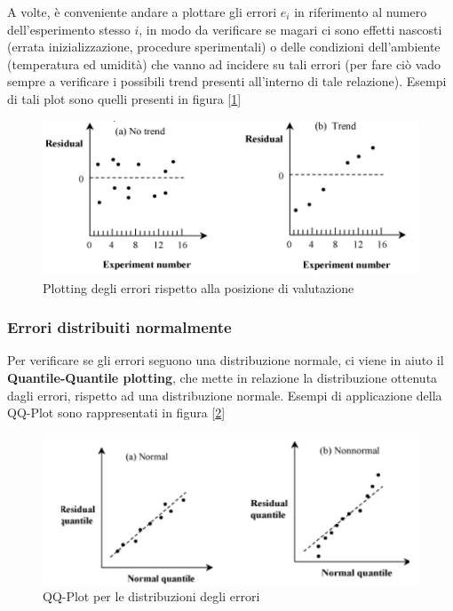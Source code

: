 A volte, è conveniente andare a plottare gli errori \(e_i\) in riferimento al numero dell'esperimento stesso \(i\), in modo da verificare se magari ci sono effetti nascosti (errata inizializzazione, procedure sperimentali) o delle condizioni dell'ambiente (temperatura ed umidità) che vanno ad incidere su tali errori (per fare ciò vado sempre a verificare i possibili trend presenti all'interno di tale relazione). Esempi di tali plot sono quelli presenti in figura [\ref{img:errors-side-effect}]

\begin{figure}[h]
\centering
\includegraphics[width=.7\textwidth]{img/chapter-5/errors-side-effect.png}
\caption{Plotting degli errori rispetto alla posizione di valutazione}\label{img:errors-side-effect}
\end{figure}

\subsubsection{Errori distribuiti normalmente}
Per verificare se gli errori seguono una distribuzione normale, ci viene in aiuto il \textbf{Quantile-Quantile plotting}, che mette in relazione la distribuzione ottenuta dagli errori, rispetto ad una distribuzione normale. Esempi di applicazione della QQ-Plot sono rappresentati in figura [\ref{img:qqplot-errors}]

\begin{figure}[h]
\centering
\includegraphics[width=.7\textwidth]{img/chapter-5/qqplot-errors.png}
\caption{QQ-Plot per le distribuzioni degli errori}\label{img:qqplot-errors}
\end{figure}

